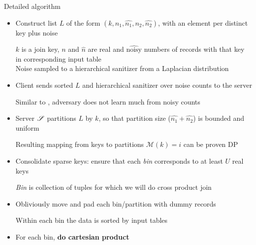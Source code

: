 	\begin{frame}{Detailed algorithm}

		\begin{itemize}
			\item<1->
				Construct list $L$ of the form $(k, n_1, \hat{n_1}, n_2, \hat{n_2})$, with an element per distinct key plus noise \\
				\begin{small}
					$k$ is a join key, $n$ and $\hat{n}$ are real and $\widehat{\text{noisy}}$ numbers of records with that key in corresponding input table \\
					Noise sampled to a hierarchical sanitizer from a Laplacian distribution
				\end{small}

			\item<2->
				Client \user{} sends sorted $L$ and hierarchical sanitizer over noise counts to the server \server{} \\
				\begin{small}
					Similar to \epsolute{}, adversary does not learn much from noisy counts
				\end{small}

			\item<3->
				Server $\mathscr{S}{}$ partitions $L$ by $k$, so that partition size ($\hat{n_1} + \hat{n_2}$) is bounded and uniform \\
				\begin{small}
					Resulting mapping from keys to partitions $\mathcal{M}(k) = i$ can be proven DP
				\end{small}

			\item<4->
				Consolidate sparse keys: ensure that each \emph{bin} corresponds to at least $U$ real keys \\
				\begin{small}
					\emph{Bin} is collection of tuples for which we will do cross product join
				\end{small}

			\item<5->
				Obliviously move and pad each bin/partition with dummy records \\
				\begin{small}
					Within each bin the data is sorted by input tables
				\end{small}

			\item<6->
				For each bin, \textbf{do cartesian product}

		\end{itemize}

	\end{frame}
